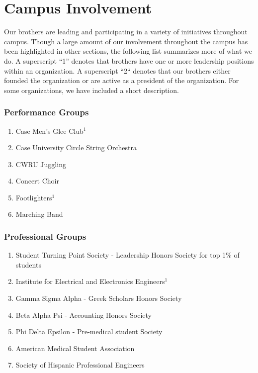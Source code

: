 \chapter{Campus Involvement}

  Our brothers are leading and participating in a variety of initiatives throughout campus. Though a large amount of our involvement throughout the campus has been highlighted in other sections, the following list summarizes more of what we do. A superscript ``1'' denotes that brothers have one or more leadership positions within an organization. A superscript ``2`` denotes that our brothers either founded the organization or are active as a president of the organization. For some organizations, we have included a short description.
    
    \subsection*{Performance Groups}
      \begin{enumerate}
      	\item Case Men's Glee Club$^1$
      	\item Case University Circle String Orchestra
      	\item CWRU Juggling
      	\item Concert Choir
      	\item Footlighters$^1$
      	\item Marching Band
      \end{enumerate}
      
    \subsection*{Professional Groups}
      \begin{enumerate}
      	\item Student Turning Point Society - Leadership Honors Society for top 1\% of students
      	\item Institute for Electrical and Electronics Engineers$^1$
      	\item Gamma Sigma Alpha - Greek Scholars Honors Society
      	\item Beta Alpha Psi - Accounting Honors Society
      	\item Phi Delta Epsilon - Pre-medical student Society
      	\item American Medical Student Association
      	\item Society of Hispanic Professional Engineers
      \end{enumerate}
      
